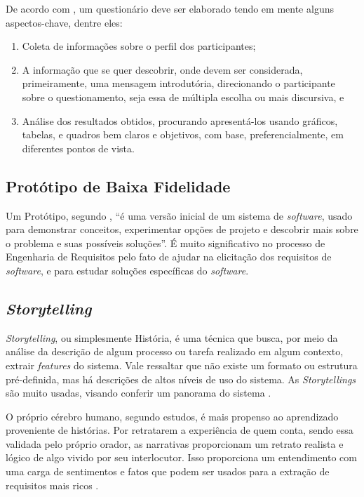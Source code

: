 De acordo com , um questionário deve ser elaborado tendo em mente alguns aspectos-chave, dentre eles: 

\begin{enumerate}
    \item Coleta de informações sobre o perfil dos participantes; 
    \item A informação que se quer descobrir, onde devem ser considerada, primeiramente, uma mensagem  introdutória, direcionando o participante sobre o questionamento, seja essa de múltipla escolha ou mais discursiva, e
    \item Análise dos resultados obtidos, procurando apresentá-los usando gráficos, tabelas, e quadros bem claros e objetivos, com base, preferencialmente, em diferentes pontos de vista.
\end{enumerate}

\subsection{Protótipo de Baixa Fidelidade}

\label{sec:prototipo-def}

Um Protótipo, segundo , “é uma versão inicial de um sistema de \textit{software}, usado para demonstrar conceitos, experimentar opções de projeto e descobrir mais sobre o problema e suas possíveis soluções”. É muito significativo no processo de Engenharia de Requisitos pelo fato de ajudar na elicitação dos requisitos de \textit{software}, e para estudar soluções específicas do \textit{software}.

\subsection{\textit{Storytelling}}

\label{sec:storytelling}

\textit{Storytelling}, ou simplesmente História, é uma técnica que busca, por meio da análise da descrição de algum processo ou tarefa realizado em algum contexto, extrair \textit{features} do sistema. Vale ressaltar que não existe um formato ou estrutura pré-definida, mas há descrições de altos níveis de uso do sistema. As \textit{Storytellings} são muito usadas, visando conferir um panorama do sistema  \cite{Sommerville10}.

O próprio cérebro humano, segundo estudos, é mais propenso ao aprendizado proveniente de histórias. Por retratarem a experiência de quem conta, sendo essa validada pelo próprio orador, as narrativas proporcionam um retrato realista e lógico de algo vivido por seu interlocutor. Isso proporciona um entendimento com uma carga de sentimentos e fatos que podem ser usados para a extração de requisitos mais ricos  \cite{storytelling}.

